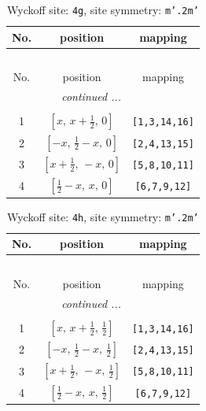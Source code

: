\documentclass[fleqn,8pt]{jsarticle}
\begin{document}
\renewcommand{\arraystretch}{1.2}
\begin{longtable}{ccc}
\caption{Wyckoff site: {\tt 4g}, site symmetry: {\tt m'.2m'}}
 \\
 \hline \hline
No. & position & mapping \\ \hline \endfirsthead

\multicolumn{2}{l}{\tablename\ \thetable{}} \\
 \hline \hline
No. & position & mapping \\ \hline \endhead

 \hline \hline
\multicolumn{2}{r}{\footnotesize\it continued ...} \\ \endfoot

 \hline \hline
\multicolumn{2}{r}{} \\ \endlastfoot

1 & $\left[ x,\, x + \frac{1}{2},\, 0 \right]$ & {\tt [1,3,14,16]} \\ \hline
2 & $\left[ - x,\, \frac{1}{2} - x,\, 0 \right]$ & {\tt [2,4,13,15]} \\ \hline
3 & $\left[ x + \frac{1}{2},\, - x,\, 0 \right]$ & {\tt [5,8,10,11]} \\ \hline
4 & $\left[ \frac{1}{2} - x,\, x,\, 0 \right]$ & {\tt [6,7,9,12]} \\
\end{longtable}
\renewcommand{\arraystretch}{1.2}
\begin{longtable}{ccc}
\caption{Wyckoff site: {\tt 4h}, site symmetry: {\tt m'.2m'}}
 \\
 \hline \hline
No. & position & mapping \\ \hline \endfirsthead

\multicolumn{2}{l}{\tablename\ \thetable{}} \\
 \hline \hline
No. & position & mapping \\ \hline \endhead

 \hline \hline
\multicolumn{2}{r}{\footnotesize\it continued ...} \\ \endfoot

 \hline \hline
\multicolumn{2}{r}{} \\ \endlastfoot

1 & $\left[ x,\, x + \frac{1}{2},\, \frac{1}{2} \right]$ & {\tt [1,3,14,16]} \\ \hline
2 & $\left[ - x,\, \frac{1}{2} - x,\, \frac{1}{2} \right]$ & {\tt [2,4,13,15]} \\ \hline
3 & $\left[ x + \frac{1}{2},\, - x,\, \frac{1}{2} \right]$ & {\tt [5,8,10,11]} \\ \hline
4 & $\left[ \frac{1}{2} - x,\, x,\, \frac{1}{2} \right]$ & {\tt [6,7,9,12]} \\
\end{longtable}
\end{document}
